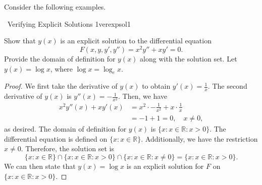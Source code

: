         \pagebreak
        \vphantom
        \\
        \\
        Consider the following examples.
        \begin{example}{\Difficulty\,\Difficulty\,\,Verifying Explicit Solutions 1}{verexpsol1}
        
            Show that \(y(x)\) is an explicit solution to the differential equation
            \begin{equation*}
                F(x,y,y',y'')=x^2y''+xy'=0.
            \end{equation*}
            Provide the domain of definition for \(y(x)\) along with the solution set. Let \(y(x)=\log x\), where \(\log x=\log_e x\).
            \begin{proof}
                We first take the derivative of \(y(x)\) to obtain \(y'(x)=\frac{1}{x}\). The second derivative of \(y(x)\) is \(y''(x)=-\frac{1}{x^2}\). Then, we have
                \begin{align*}
                    x^2y''(x)+xy'(x)&=x^2\cdot-\frac{1}{x^2}+x\cdot\frac{1}{x} \\
                    &=-1+1=0,\quad x\neq0,
                \end{align*}
                as desired. The domain of definition for \(y(x)\) is \(\{x:x\in \mathbb{R}:x>0\}\). The differential equation is defined on \(\{x:x\in\mathbb{R}\}\). Additionally, we have the restriction \(x\neq 0\). Therefore, the solution set is 
                \begin{equation*}
                    \{x:x\in\mathbb{R}\}\cap\{x:x\in\mathbb{R}:x>0\}\cap\{x:x\in\mathbb{R}:x\neq0\}=\{x:x\in\mathbb{R}:x>0\}.
                \end{equation*}
                We can then state that \(y(x)=\log x\) is an explicit solution for \(F\) on \(\{x:x\in\mathbb{R}:x>0\}\).
            \end{proof}

        \end{example}
